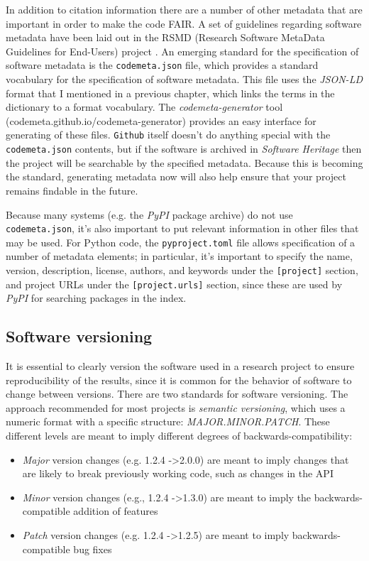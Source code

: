In addition to citation information there are a number of other metadata that are important in order to make the code FAIR.  A set of guidelines regarding software metadata have been laid out in the RSMD (Research Software MetaData Guidelines for End-Users) project \citep{Gruenpeter:2024aa}.  An emerging standard for the specification of software metadata is the \texttt{codemeta.json} file, which provides a standard vocabulary for the specification of software metadata.  This file uses the \textit{JSON-LD} format that I mentioned in a previous chapter, which links the terms in the dictionary to a format vocabulary.  The \textit{codemeta-generator} tool (codemeta.github.io/codemeta-generator) provides an easy interface for generating of these files.  \texttt{Github} itself doesn't do anything special with the \texttt{codemeta.json} contents, but if the software is archived in \textit{Software Heritage} then the project will be searchable by the specified metadata. Because this is becoming the standard, generating metadata now will also help ensure that your project remains findable in the future.

Because many systems (e.g. the \textit{PyPI} package archive) do not use \texttt{codemeta.json}, it's also important to put relevant information in other files that may be used.  For Python code, the \texttt{pyproject.toml} file allows specification of a number of metadata elements; in particular, it's important to specify the name, version, description, license, authors, and keywords under the \texttt{[project]} section, and project URLs under the \texttt{[project.urls]} section, since these are used by \textit{PyPI} for searching packages in the index.

\subsection{Software versioning}

It is essential to clearly version the software used in a research project to ensure reproducibility of the results, since it is common for the behavior of software to change between versions.  There are two standards for software versioning.  The approach recommended for most projects is \textit{semantic versioning}, which uses a numeric format with a specific structure: \textit{MAJOR.MINOR.PATCH}.  These different levels are meant to imply different degrees of backwards-compatibility:

\begin{itemize}
\item \textit{Major} version changes (e.g. 1.2.4 -\textgreater 2.0.0) are meant to imply changes that are likely to break previously working code, such as changes in the API
\item \textit{Minor} version changes (e.g., 1.2.4 -\textgreater 1.3.0) are meant to imply the backwards-compatible addition of features
\item \textit{Patch} version changes (e.g. 1.2.4 -\textgreater 1.2.5) are meant to imply backwards-compatible bug fixes
\end{itemize}


